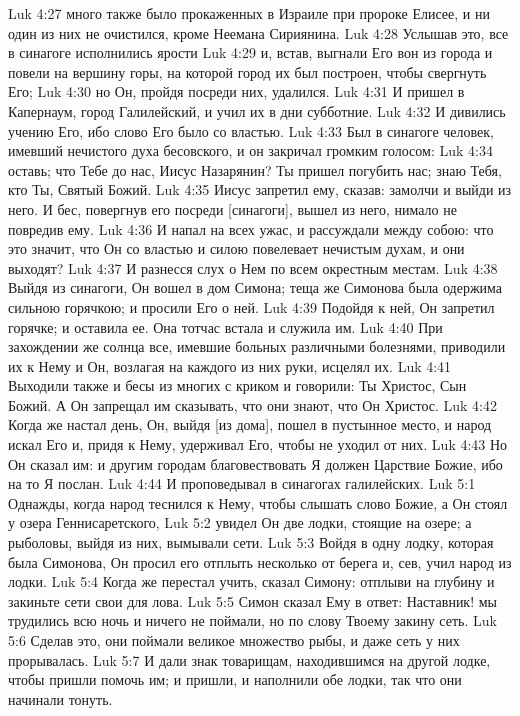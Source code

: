 Luk 4:27  много также было прокаженных в Израиле при пророке Елисее, и ни один из них не очистился, кроме Неемана Сириянина.
Luk 4:28  Услышав это, все в синагоге исполнились ярости
Luk 4:29  и, встав, выгнали Его вон из города и повели на вершину горы, на которой город их был построен, чтобы свергнуть Его;
Luk 4:30  но Он, пройдя посреди них, удалился.
Luk 4:31  И пришел в Капернаум, город Галилейский, и учил их в дни субботние.
Luk 4:32  И дивились учению Его, ибо слово Его было со властью.
Luk 4:33  Был в синагоге человек, имевший нечистого духа бесовского, и он закричал громким голосом:
Luk 4:34  оставь; что Тебе до нас, Иисус Назарянин? Ты пришел погубить нас; знаю Тебя, кто Ты, Святый Божий.
Luk 4:35  Иисус запретил ему, сказав: замолчи и выйди из него. И бес, повергнув его посреди [синагоги], вышел из него, нимало не повредив ему.
Luk 4:36  И напал на всех ужас, и рассуждали между собою: что это значит, что Он со властью и силою повелевает нечистым духам, и они выходят?
Luk 4:37  И разнесся слух о Нем по всем окрестным местам.
Luk 4:38  Выйдя из синагоги, Он вошел в дом Симона; теща же Симонова была одержима сильною горячкою; и просили Его о ней.
Luk 4:39  Подойдя к ней, Он запретил горячке; и оставила ее. Она тотчас встала и служила им.
Luk 4:40  При захождении же солнца все, имевшие больных различными болезнями, приводили их к Нему и Он, возлагая на каждого из них руки, исцелял их.
Luk 4:41  Выходили также и бесы из многих с криком и говорили: Ты Христос, Сын Божий. А Он запрещал им сказывать, что они знают, что Он Христос.
Luk 4:42  Когда же настал день, Он, выйдя [из дома], пошел в пустынное место, и народ искал Его и, придя к Нему, удерживал Его, чтобы не уходил от них.
Luk 4:43  Но Он сказал им: и другим городам благовествовать Я должен Царствие Божие, ибо на то Я послан.
Luk 4:44  И проповедывал в синагогах галилейских.
Luk 5:1  Однажды, когда народ теснился к Нему, чтобы слышать слово Божие, а Он стоял у озера Геннисаретского,
Luk 5:2  увидел Он две лодки, стоящие на озере; а рыболовы, выйдя из них, вымывали сети.
Luk 5:3  Войдя в одну лодку, которая была Симонова, Он просил его отплыть несколько от берега и, сев, учил народ из лодки.
Luk 5:4  Когда же перестал учить, сказал Симону: отплыви на глубину и закиньте сети свои для лова.
Luk 5:5  Симон сказал Ему в ответ: Наставник! мы трудились всю ночь и ничего не поймали, но по слову Твоему закину сеть.
Luk 5:6  Сделав это, они поймали великое множество рыбы, и даже сеть у них прорывалась.
Luk 5:7  И дали знак товарищам, находившимся на другой лодке, чтобы пришли помочь им; и пришли, и наполнили обе лодки, так что они начинали тонуть.
